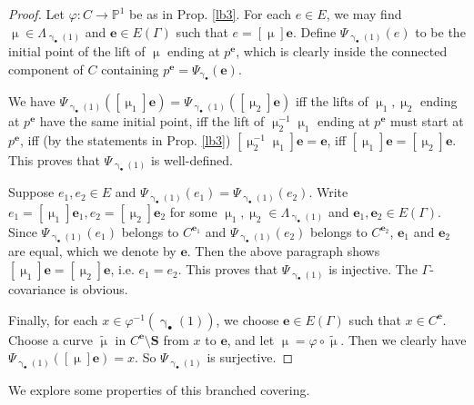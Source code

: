 \documentclass[11pt,b5paper,notitlepage]{article}
\theoremstyle{definition}
\theoremstyle{plain}
\newcommand{\wtd}{\widetilde}
\newcommand{\mbf}{\mathbf}
\newcommand{\blt}{\bullet}
\newcommand{\Pbb}{\mathbb P}
\newcommand{\Sbf}{\mathbf{S}}
\numberwithin{equation}{subsection}
\begin{document}
\begin{proof}
Let $\varphi:C\rightarrow\Pbb^1$ be as in Prop. \ref{lb3}. For each $e\in E$, we may find $\upmu\in\Lambda_{\upgamma_\blt(1)}$ and $\mbf e\in E(\Gamma)$ such that $e=[\upmu]\mbf e$. Define $\Psi_{\upgamma_\blt(1)}(e)$ to be the initial point of the lift of $\upmu$ ending at $p^{\mbf e}$, which is clearly inside the connected component of $C$ containing $p^{\mbf e}=\Psi_{\upgamma_\blt}(\mbf e)$.

We have $\Psi_{\upgamma_\blt(1)}([\upmu_1]\mbf e)=\Psi_{\upgamma_\blt(1)}([\upmu_2]\mbf e)$ iff the lifts of $\upmu_1,\upmu_2$ ending at $p^{\mbf e}$ have the same initial point, iff the lift of $\upmu_2^{-1}\upmu_1$ ending at $p^{\mbf e}$ must start at $p^{\mbf e}$, iff (by the statements in Prop. \ref{lb3}) $[\upmu_2^{-1}\upmu_1]\mbf e=\mbf e$, iff $[\upmu_1]\mbf e=[\upmu_2]\mbf e$. This proves that $\Psi_{\upgamma_\blt(1)}$ is well-defined.

Suppose $e_1,e_2\in E$ and $\Psi_{\upgamma_\blt(1)}(e_1)=\Psi_{\upgamma_\blt(1)}(e_2)$. Write $e_1=[\upmu_1]\mbf e_1,e_2=[\upmu_2]\mbf e_2$ for some $\upmu_1,\upmu_2\in\Lambda_{\upgamma_\blt(1)}$ and $\mbf e_1,\mbf e_2\in E(\Gamma)$. Since $\Psi_{\upgamma_\blt(1)}(e_1)$ belongs to $C^{\mbf e_1}$ and $\Psi_{\upgamma_\blt(1)}(e_2)$ belongs to $C^{\mbf e_2}$,  $\mbf e_1$ and $\mbf e_2$ are equal, which we denote by $\mbf e$. Then the above paragraph shows $[\upmu_1]\mbf e=[\upmu_2]\mbf e$, i.e. $e_1=e_2$. This proves that $\Psi_{\upgamma_\blt(1)}$ is injective. The $\Gamma$-covariance is obvious.

Finally, for each $x\in \varphi^{-1}(\upgamma_\blt(1))$, we choose $\mbf e\in E(\Gamma)$ such that $x\in C^{\mbf e}$. Choose a curve $\wtd\upmu$ in $C^{\mbf e}\setminus\Sbf$ from $x$ to $\mbf e$, and let $\upmu=\varphi\circ\wtd\upmu$. Then we clearly have $\Psi_{\upgamma_\blt(1)}([\upmu]\mbf e)=x$. So $\Psi_{\upgamma_\blt(1)}$ is surjective.
\end{proof}







We explore some properties of this branched covering. 
\end{document}
